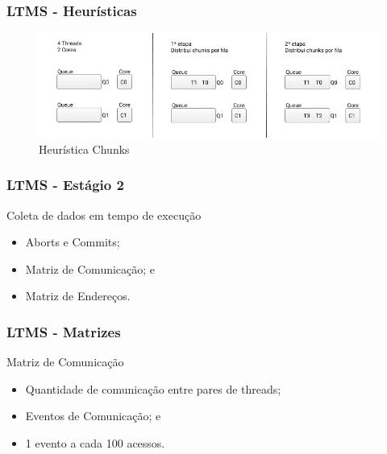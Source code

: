 \documentclass[10pt, pdf,xcolor=pdftex,dvipsnames,table]{beamer}
\begin{document}
\begin{frame} \frametitle{LTMS - Heurísticas}
    \begin{figure}[!h]
        \includegraphics[scale=0.4]{images/Queue_chunks}
        \caption{Heurística Chunks}
        \label{fig:abusy}
    \end{figure}
\end{frame}

\begin{frame} \frametitle{LTMS - Estágio 2}
    \begin{block}{Coleta de dados em tempo de execução}
        \begin{itemize}
        	\item Aborts e Commits;
        	\item Matriz de Comunicação; e 
        	\item Matriz de Endereços.
        \end{itemize}
    \end{block}
\end{frame}

\begin{frame} \frametitle{LTMS - Matrizes}
    \begin{block}{Matriz de Comunicação}
        \begin{itemize}
        	\item Quantidade de comunicação entre pares de threads;
        	\item Eventos de Comunicação; e
        	\item 1 evento a cada 100 acessos.
        \end{itemize}
    \end{block}
\end{frame}
\end{document}
